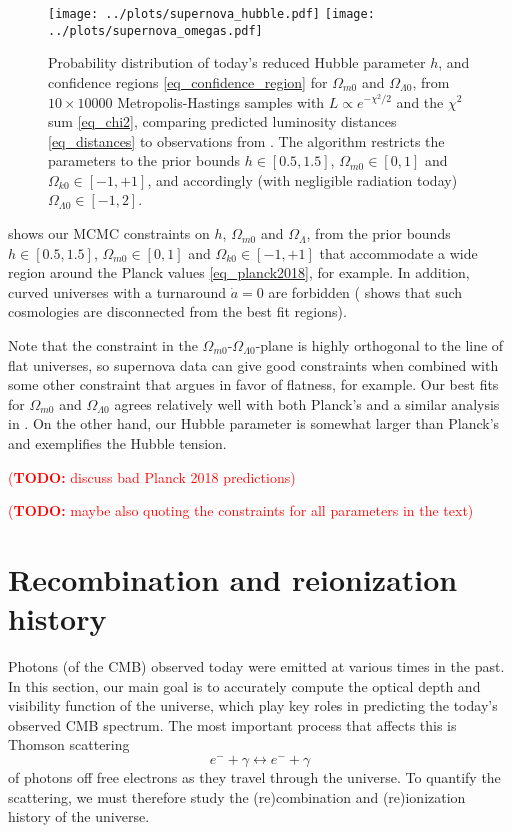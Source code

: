 \documentclass[10pt,a4paper]{article}
\newcommand\TODO[1]{\textcolor{red}{(\textbf{TODO:} #1)}}
\begin{document}
\begin{figure}[b]
	\centering
	\texttt{[image: ../plots/supernova\_hubble.pdf]}
	\texttt{[image: ../plots/supernova\_omegas.pdf]}
	\caption{%
		Probability distribution of today's reduced Hubble parameter $h$,
		and confidence regions \eqref{eq_confidence_region} for $\Omega_{m0}$ and $\Omega_{\Lambda0}$,
		from $10 \times 10000$ Metropolis-Hastings samples with $L \propto e^{-\chi^2/2}$ and the $\chi^2$ sum \eqref{eq_chi2},
		comparing predicted luminosity distances \eqref{eq_distances} to observations from \cite{betouleImprovedCosmologicalConstraints2014}.
		The algorithm restricts the parameters to the prior bounds $h \in [0.5, 1.5]$, $\Omega_{m0} \in [0, 1]$ and $\Omega_{k0} \in [-1, +1]$, and accordingly (with negligible radiation today) $\Omega_{\Lambda0} \in [-1, 2]$.
	}
	\label{fig_supernova_mcmc}
\end{figure}

 shows our MCMC constraints on $h$, $\Omega_{m0}$ and $\Omega_\Lambda$,
from the prior bounds $h \in [0.5, 1.5]$, $\Omega_{m0} \in [0, 1]$ and $\Omega_{k0} \in [-1, +1]$
that accommodate a wide region around the Planck values \eqref{eq_planck2018}, for example.
In addition, curved universes with a turnaround $\dot{a} = 0$ are forbidden
(\cite[Figure 11]{amanullahSpectraLightCurves2010} shows that such cosmologies are disconnected from the best fit regions).

Note that the constraint in the $\Omega_{m0}$-$\Omega_{\Lambda0}$-plane is highly orthogonal to the line of flat universes,
so supernova data can give good constraints when combined with some other constraint that argues in favor of flatness, for example.
Our best fits for $\Omega_{m0}$ and $\Omega_{\Lambda0}$ agrees relatively well with both Planck's and a similar analysis in \cite[Fig. 15]{betouleImprovedCosmologicalConstraints2014}.
On the other hand, our Hubble parameter is somewhat larger than Planck's and exemplifies the Hubble tension.

\TODO{discuss bad Planck 2018 predictions}

\TODO{maybe also quoting the constraints for all parameters in the text}

\clearpage
\section{Recombination and reionization history}

Photons (of the CMB) observed today were emitted at various times in the past.
In this section, our main goal is to accurately compute the optical depth and visibility function of the universe,
which play key roles in predicting the today's observed CMB spectrum.
The most important process that affects this is Thomson scattering
\begin{equation}
	e^- + \gamma \leftrightarrow e^- + \gamma
\label{eq_thomson_scattering}
\end{equation}
of photons off free electrons as they travel through the universe.
To quantify the scattering,
we must therefore study the (re)combination and (re)ionization history of the universe.
\end{document}
